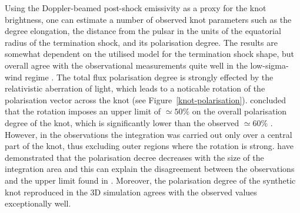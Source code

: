 Using the Doppler-beamed post-shock emissivity as a proxy for the knot brightness, one can estimate a number of observed  knot parameters such as the degree elongation, the distance from the pulsar in the units of the equatorial radius of the termination shock, and its polarisation degree.     The results are somewhat dependent on the  utilised model for the termination shock shape, but overall agree with the observational measurements quite well in the low-sigma-wind regime .  
The total flux polarisation degree is strongly effected by the relativistic aberration of light, which leads to a noticable rotation of the polarisation vector across the knot (see Figure~\ref{knot-polarisation}).  \citet{YB-15} concluded that the rotation imposes an upper limit 
of $\simeq 50\%$ on the overall polarisation degree of the knot, which is significantly lower than the observed $\simeq 60\%$ .  However, in the observations the integration was carried out only over a central part of the knot, thus excluding outer regions where the rotation is strong. \citep{LKP-16} have demonstrated that the polarisation decree decreases with the size of the integration area and this can explain the disagreement  between the observations and the upper limit found  in \citep{YB-15}.      
Moreover, the polarisation degree of the synthetic knot reproduced in the 3D simulation \citep{} agrees with the observed values exceptionally well. 